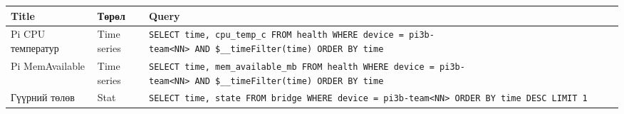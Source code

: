 \begingroup\scriptsize\begin{longtable}[]{@{}lll@{}}
\toprule
\begin{minipage}[b]{0.30\columnwidth}\raggedright
Title\strut
\end{minipage} & \begin{minipage}[b]{0.30\columnwidth}\raggedright
Төрөл\strut
\end{minipage} & \begin{minipage}[b]{0.30\columnwidth}\raggedright
Query\strut
\end{minipage}\tabularnewline
\midrule
\endhead
\begin{minipage}[t]{0.30\columnwidth}\raggedright
Pi CPU температур\strut
\end{minipage} & \begin{minipage}[t]{0.30\columnwidth}\raggedright
Time series\strut
\end{minipage} & \begin{minipage}[t]{0.30\columnwidth}\raggedright
\texttt{SELECT\ time,\ cpu\_temp\_c\ FROM\ health\ WHERE\ device\ =\ \textquotesingle{}pi3b-team\textless{}NN\textgreater{}\textquotesingle{}\ AND\ \$\_\_timeFilter(time)\ ORDER\ BY\ time}\strut
\end{minipage}\tabularnewline
\begin{minipage}[t]{0.30\columnwidth}\raggedright
Pi MemAvailable\strut
\end{minipage} & \begin{minipage}[t]{0.30\columnwidth}\raggedright
Time series\strut
\end{minipage} & \begin{minipage}[t]{0.30\columnwidth}\raggedright
\texttt{SELECT\ time,\ mem\_available\_mb\ FROM\ health\ WHERE\ device\ =\ \textquotesingle{}pi3b-team\textless{}NN\textgreater{}\textquotesingle{}\ AND\ \$\_\_timeFilter(time)\ ORDER\ BY\ time}\strut
\end{minipage}\tabularnewline
\begin{minipage}[t]{0.30\columnwidth}\raggedright
Гүүрний төлөв\strut
\end{minipage} & \begin{minipage}[t]{0.30\columnwidth}\raggedright
Stat\strut
\end{minipage} & \begin{minipage}[t]{0.30\columnwidth}\raggedright
\texttt{SELECT\ time,\ state\ FROM\ bridge\ WHERE\ device\ =\ \textquotesingle{}pi3b-team\textless{}NN\textgreater{}\textquotesingle{}\ ORDER\ BY\ time\ DESC\ LIMIT\ 1}\strut
\end{minipage}\tabularnewline
\bottomrule
\end{longtable}\endgroup

